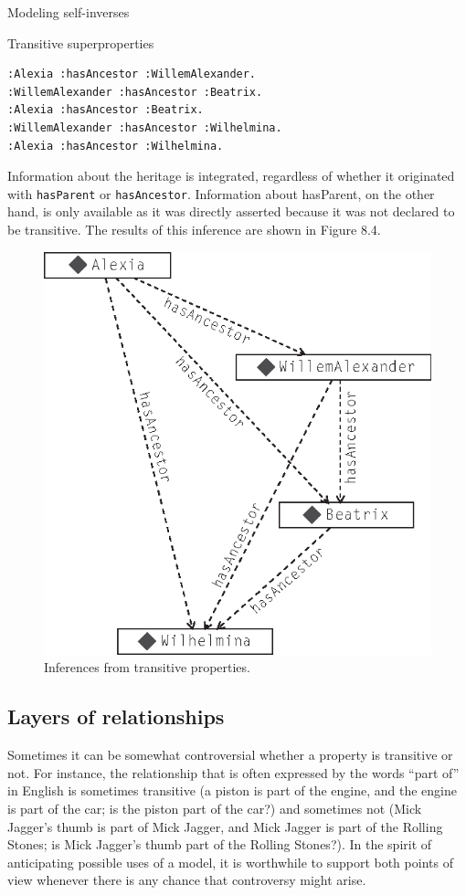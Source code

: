 \begin{challenge}{Modeling self-inverses}
\begin{challenge}{Transitive superproperties}
\begin{lstlisting}
:Alexia :hasAncestor :WillemAlexander.
:WillemAlexander :hasAncestor :Beatrix.
:Alexia :hasAncestor :Beatrix.
:WillemAlexander :hasAncestor :Wilhelmina.
:Alexia :hasAncestor :Wilhelmina.
\end{lstlisting}

Information about the heritage is integrated, regardless of whether it
originated with \texttt{hasParent} or \texttt{hasAncestor}. Information about hasParent,
on the other hand, is only available as it was directly asserted because
it was not declared to be transitive. The results of this inference are
shown in Figure 8.4.
\end{challenge}

\begin{figure}
\centering
\includegraphics[width=5in]{media/ch9/f09-004.eps}
\caption{Inferences from transitive properties.}
\label{fig:ch9.4}
\end{figure}



\subsection{Layers of relationships}

Sometimes it can be somewhat controversial whether a property is
transitive or not. For instance, the relationship that is often
expressed by the words ``part of'' in English is sometimes transitive (a
piston is part of the engine, and the engine is part of the car; is the
piston part of the car?) and sometimes not (Mick Jagger's thumb is part
of Mick Jagger, and Mick Jagger is part of the Rolling Stones; is Mick
Jagger's thumb part of the Rolling Stones?). In the spirit of
anticipating possible uses of a model, it is worthwhile to support both
points of view whenever there is any chance that controversy might
arise.


\end{challenge}
